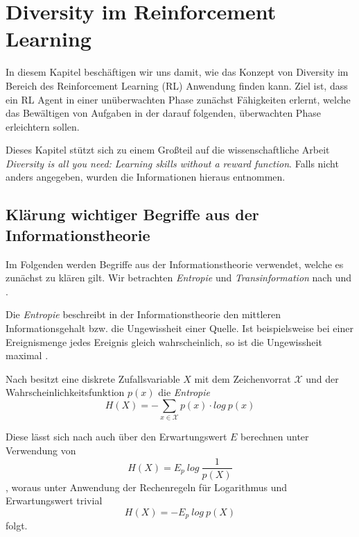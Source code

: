 \section{Diversity im Reinforcement Learning}
\label{sec:diversity}
In diesem Kapitel beschäftigen wir uns damit, wie das Konzept von Diversity im Bereich des Reinforcement Learning (RL) Anwendung finden kann. Ziel ist, dass ein RL Agent in einer unüberwachten Phase zunächst Fähigkeiten erlernt, welche das Bewältigen von Aufgaben in der darauf folgenden, überwachten Phase erleichtern sollen.

Dieses Kapitel stützt sich zu einem Großteil auf die wissenschaftliche Arbeit \textit{Diversity is all you need: Learning skills without a reward function}\cite{diversity_eysenbach}. Falls nicht anders angegeben, wurden die Informationen hieraus entnommen.

\subsection{Klärung wichtiger Begriffe aus der Informationstheorie}
\label{sec:informationtheory}
Im Folgenden werden Begriffe aus der Informationstheorie verwendet, welche es zunächst zu klären gilt. Wir betrachten \textit{Entropie} und \textit{Transinformation} nach \cite{elements_cover} und \cite{information_werner}.

\smallspace

Die \textit{Entropie} beschreibt in der Informationstheorie den mittleren Informationsgehalt bzw. die Ungewissheit einer Quelle. Ist beispielsweise bei einer Ereignismenge jedes Ereignis gleich wahrscheinlich, so ist die Ungewissheit maximal \cite{information_werner}.

Nach \cite{elements_cover} besitzt eine diskrete Zufallsvariable $ X $ mit dem Zeichenvorrat $ \mathcal{X} $ und der Wahrscheinlichkeitsfunktion $ p(x) $ die \textit{Entropie}
\begin{equation*}
    H(X) = -\sum_{x \in \mathcal{X}} p(x) \cdot log\ p(x) \label{eq:entropy}
\end{equation*}

Diese lässt sich nach \cite{elements_cover} auch über den Erwartungswert $ E $ berechnen unter Verwendung von
\begin{equation*}
    H(X) = E_p\ log\ \frac{1}{p(X)} \label{eq:entropy_1}
\end{equation*}
, woraus unter Anwendung der Rechenregeln für Logarithmus und Erwartungswert trivial
\begin{equation}
    H(X) = - E_p\ log\ p(X) \label{eq:entropy_2}
\end{equation}
folgt.

